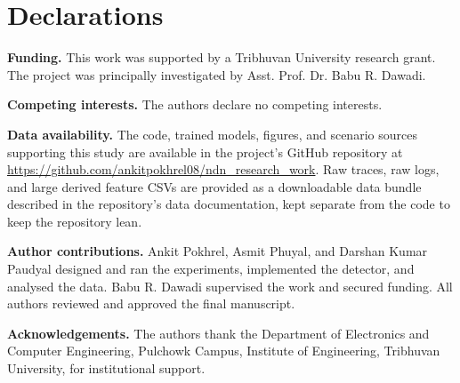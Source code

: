 \section*{Declarations}

\noindent\textbf{Funding.} This work was supported by a Tribhuvan University research grant. The project was principally investigated by Asst. Prof. Dr. Babu R. Dawadi.

\noindent\textbf{Competing interests.} The authors declare no competing interests.

\noindent\textbf{Data availability.} The code, trained models, figures, and scenario sources supporting this study are available in the project's GitHub repository at \url{https://github.com/ankitpokhrel08/ndn_research_work}. Raw traces, raw logs, and large derived feature CSVs are provided as a downloadable data bundle described in the repository's data documentation, kept separate from the code to keep the repository lean.

\noindent\textbf{Author contributions.} Ankit Pokhrel, Asmit Phuyal, and Darshan Kumar Paudyal designed and ran the experiments, implemented the detector, and analysed the data. Babu R. Dawadi supervised the work and secured funding. All authors reviewed and approved the final manuscript.

\noindent\textbf{Acknowledgements.} The authors thank the Department of Electronics and Computer Engineering, Pulchowk Campus, Institute of Engineering, Tribhuvan University, for institutional support.
